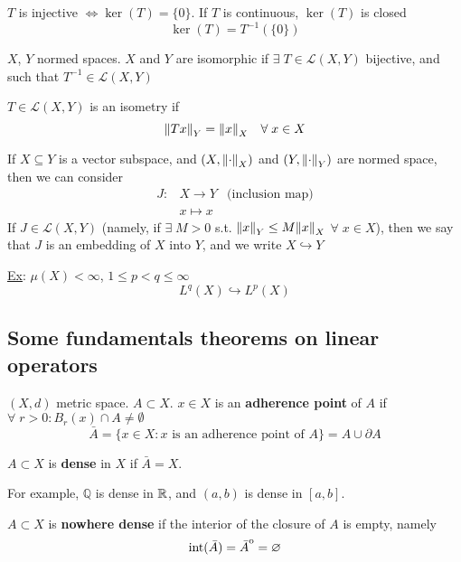 \noindent \(T\) is injective \(\Leftrightarrow \ker (T) = \{0\}\). If \(T\) is continuous, \(\ker(T)\) is closed 
\[
    \ker(T) = T^{-1} (\{0\})
\]
\begin{definition}
    \(X\), \(Y\) normed spaces. \(X\) and \(Y\) are isomorphic if \(\exists \; T \in \mathcal{L}(X, Y)\) bijective, and such that \(T^{-1} \in \mathcal{L}(X, Y)\)
\end{definition}
\begin{definition}
    \(T \in \mathcal{L}(X, Y)\) is an isometry if
    \[
        \norm{Tx}_Y = \norm{x}_X \quad \forall \; x \in X
    \]
\end{definition}
\begin{definition}
    If \(X \subseteq Y\) is a vector subspace, and \(\left(X, \norm{\cdot}_X\right)\) and \(\left(Y, \norm{\cdot}_Y\right)\) are normed space, then we can consider 
    \[
        \begin{array}{rcr}
            J: & X \to Y & \text{(inclusion map)}
            \\ & x \mapsto x
        \end{array}
    \] 
    If \(J \in \mathcal{L}(X, Y)\) (namely, if \(\exists \; M>0 \) s.t. \(\norm{x}_Y \leq M \norm{x}_X\) \(\forall \; x \in X\)), 
    then we say that \(J\) is an embedding of \(X\) into \(Y\), and we write \(X \hookrightarrow Y\)
\end{definition}

\noindent\underline{Ex}: \(\mu(X) < \infty \), \(1 \leq p < q \leq \infty\)
\[
    L^q(X) \hookrightarrow L^p(X) \tag*{(inclusion of \(L^p\) spaces)}
\]

\subsection*{Some fundamentals theorems on linear operators}
\begin{definition}
    \((X, d)\) metric space. \(A \subset X\). \(x \in X \) is an \textbf{adherence point} of \(A\) if \(\forall \; r>0: B_r(x) \cap A \neq \emptyset\)
    \[
        \bar{A} = \{ x \in X: x \text{ is an adherence point of } A \} = A \cup \partial A
    \]
\end{definition}
\begin{definition}
    \(A \subset X\) is \textbf{dense} in \(X\) if \(\bar{A} = X\).
\end{definition}
For example, \(\mathbb{Q}\) is dense in \(\mathbb{R}\), and \((a, b)\) is dense in \([a, b]\).
\begin{definition}
    \(A \subset X\) is \textbf{nowhere dense} if the interior of the closure of \(A\) is empty, namely
    \[
       \text{int} (\bar{A}) = {\kern0pt\bar{A}}^{\mathrm{o}} = \varnothing  
    \]
\end{definition}

